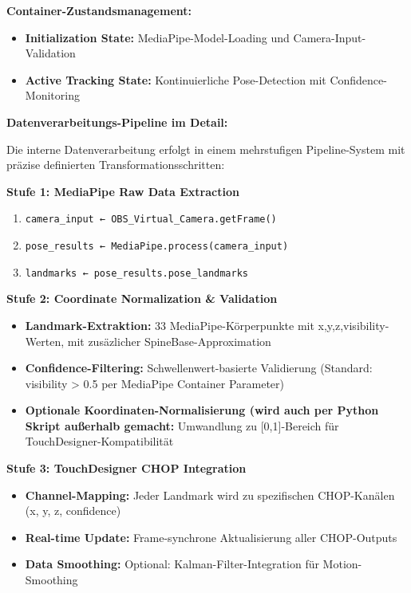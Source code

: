 \textbf{Container-Zustandsmanagement:}
\begin{itemize}
    \item \textbf{Initialization State:} MediaPipe-Model-Loading und Camera-Input-Validation
    \item \textbf{Active Tracking State:} Kontinuierliche Pose-Detection mit Confidence-Monitoring
\end{itemize}

\textbf{Datenverarbeitungs-Pipeline im Detail:}

Die interne Datenverarbeitung erfolgt in einem mehrstufigen Pipeline-System mit präzise definierten Transformationsschritten:

\textbf{Stufe 1: MediaPipe Raw Data Extraction}
\begin{enumerate}
    \item \texttt{camera\_input ← OBS\_Virtual\_Camera.getFrame()}
    \item \texttt{pose\_results ← MediaPipe.process(camera\_input)}
    \item \texttt{landmarks ← pose\_results.pose\_landmarks}
\end{enumerate}

\textbf{Stufe 2: Coordinate Normalization \& Validation}
\begin{itemize}
    \item \textbf{Landmark-Extraktion:} 33 MediaPipe-Körperpunkte mit x,y,z,visibility-Werten, mit zusäzlicher SpineBase-Approximation
    \item \textbf{Confidence-Filtering:} Schwellenwert-basierte Validierung (Standard: visibility > 0.5 per MediaPipe Container Parameter)
    \item \textbf{Optionale Koordinaten-Normalisierung (wird auch per Python Skript außerhalb gemacht:} Umwandlung zu [0,1]-Bereich für TouchDesigner-Kompatibilität
\end{itemize}

\textbf{Stufe 3: TouchDesigner CHOP Integration}
\begin{itemize}
    \item \textbf{Channel-Mapping:} Jeder Landmark wird zu spezifischen CHOP-Kanälen (x, y, z, confidence)
    \item \textbf{Real-time Update:} Frame-synchrone Aktualisierung aller CHOP-Outputs
    \item \textbf{Data Smoothing:} Optional: Kalman-Filter-Integration für Motion-Smoothing
\end{itemize}

